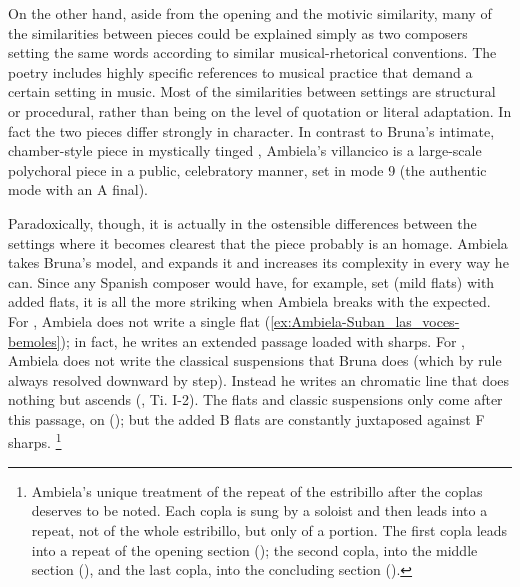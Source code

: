 On the other hand, aside from the opening and the motivic similarity, many of the similarities between pieces could be explained simply as two composers setting the same words according to similar musical-rhetorical conventions.
The poetry includes highly specific references to musical practice that demand a certain setting in music.
Most of the similarities between settings are structural or procedural, rather than being on the level of quotation or literal adaptation.
In fact the two pieces differ strongly in character.
In contrast to Bruna's intimate, chamber-style piece in mystically tinged , Ambiela's villancico is a large-scale polychoral piece in a public, celebratory manner, set in mode 9 (the authentic mode with an A final).

Paradoxically, though, it is actually in the ostensible differences between the settings where it becomes clearest that the piece probably is an homage.
Ambiela takes Bruna's model, and expands it and increases its complexity in every way he can.
Since any Spanish composer would have, for example, set  (mild flats) with added flats, it is all the more striking when Ambiela breaks with the expected.
For , Ambiela does not write a single flat (\cref{ex:Ambiela-Suban_las_voces-bemoles}); in fact, he writes an extended passage loaded with sharps.
For , Ambiela does not write the classical suspensions that Bruna does (which by rule always resolved downward by step). 
Instead he writes an chromatic line that does nothing but ascends (, Ti. I-2).
The flats and classic suspensions only come after this passage, on  (); but the added B flats are constantly juxtaposed against F sharps.%
	\footnote{%
	Ambiela's unique treatment of the repeat of the estribillo after the coplas deserves to be noted.
Each copla is sung by a soloist and then leads into a repeat, not of the whole estribillo, but only of a portion.
The first copla leads into a repeat of the opening section (); the second copla, into the middle section (), and the last copla, into the concluding section ().
	}

% 

